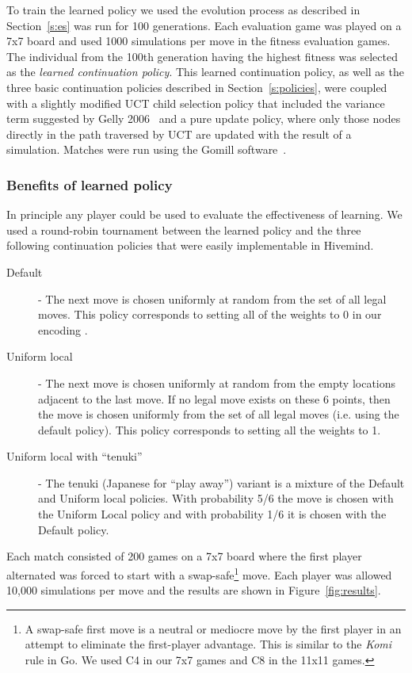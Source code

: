 \documentclass{acm_proc_article-sp}
\begin{document}
To train the learned policy we used the evolution process as described in Section~\ref{s:es} was run for 100 generations.  
Each evaluation game was played on a 7x7 board and used 1000 simulations per move in the fitness evaluation games. 
The individual from the 100th generation having the highest fitness was selected as the \emph{learned continuation policy}.
This learned continuation policy, as well as the three basic continuation policies described in Section~\ref{s:policies}, were coupled with
a slightly modified UCT child selection policy that included the variance term suggested by Gelly 2006~\cite{gelly2006exploration} and a
pure update policy, where only those nodes directly in the path traversed by UCT are updated with the result of a simulation.
Matches were run using the Gomill software~\cite{gomill}. 

\subsubsection*{Benefits of learned policy}
In principle any player could be used to evaluate the effectiveness of learning.   
We used a round-robin tournament between the learned policy and the three following continuation policies that were easily implementable in Hivemind.

\begin{description}
	\item[Default] - The next move is chosen uniformly at random from the set of all legal moves.
	This policy corresponds to setting all of the weights to 0 in our encoding .
	\item[Uniform local] - The next move is chosen uniformly at random from the empty locations adjacent to the last move.
	If no legal move exists on these 6 points, then the move is chosen uniformly from the set of all legal moves 
	(i.e. using the default policy).  This policy corresponds to setting all the weights to 1.
	\item[Uniform local with ``tenuki''] - The tenuki (Japanese for  ``play away'') variant is a mixture of the Default and Uniform local policies.  
	With probability 5/6 the move is chosen with the Uniform Local policy and with probability 1/6 it is chosen with the Default policy. 
\end{description}

Each match consisted of 200 games on a 7x7 board where the first player alternated was forced to start with a
swap-safe\footnote{A swap-safe first move is a neutral or mediocre move by the first player in an attempt to eliminate the first-player advantage.  This is similar to the \emph{Komi} rule in Go.  We used C4 in our 7x7 games and C8 in the 11x11 games.}
move.
Each player was allowed 10,000 simulations per move and the results are shown in Figure~\ref{fig:results}.
\end{document}
